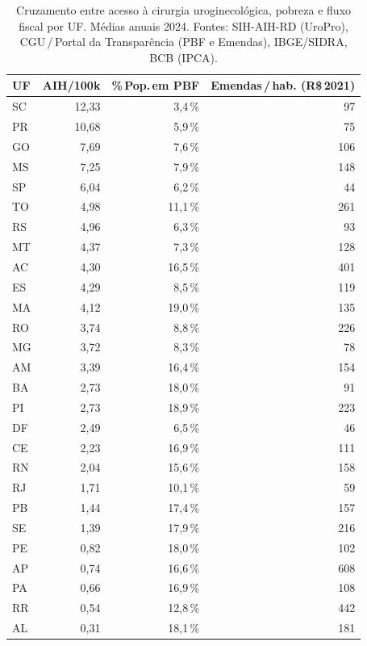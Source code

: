 \documentclass[12pt,a4paper,oneside]{article}
\begin{document}
\begin{table}[H]
\centering
\caption{Cruzamento entre acesso à cirurgia uroginecológica,
pobreza e fluxo fiscal por UF. Médias anuais 2024.
Fontes: SIH-AIH-RD (UroPro), CGU\,/\,Portal da Transparência
(PBF e Emendas), IBGE/SIDRA, BCB (IPCA).}
\label{tab:cruzamento}
\small
\begin{tabular}{lrrr}
\toprule
\textbf{UF} & \textbf{AIH/100k} & \textbf{\%\,Pop.\,em PBF} & \textbf{Emendas\,/\,hab. (R\$\,2021)} \\
\midrule
SC &  12{,}33 &  3{,}4\,\% &   97 \\
PR &  10{,}68 &  5{,}9\,\% &   75 \\
GO &   7{,}69 &  7{,}6\,\% &  106 \\
MS &   7{,}25 &  7{,}9\,\% &  148 \\
SP &   6{,}04 &  6{,}2\,\% &   44 \\
TO &   4{,}98 & 11{,}1\,\% &  261 \\
RS &   4{,}96 &  6{,}3\,\% &   93 \\
MT &   4{,}37 &  7{,}3\,\% &  128 \\
AC &   4{,}30 & 16{,}5\,\% &  401 \\
ES &   4{,}29 &  8{,}5\,\% &  119 \\
MA &   4{,}12 & 19{,}0\,\% &  135 \\
RO &   3{,}74 &  8{,}8\,\% &  226 \\
MG &   3{,}72 &  8{,}3\,\% &   78 \\
AM &   3{,}39 & 16{,}4\,\% &  154 \\
BA &   2{,}73 & 18{,}0\,\% &   91 \\
PI &   2{,}73 & 18{,}9\,\% &  223 \\
DF &   2{,}49 &  6{,}5\,\% &   46 \\
CE &   2{,}23 & 16{,}9\,\% &  111 \\
RN &   2{,}04 & 15{,}6\,\% &  158 \\
RJ &   1{,}71 & 10{,}1\,\% &   59 \\
PB &   1{,}44 & 17{,}4\,\% &  157 \\
SE &   1{,}39 & 17{,}9\,\% &  216 \\
PE &   0{,}82 & 18{,}0\,\% &  102 \\
AP &   0{,}74 & 16{,}6\,\% &  608 \\
PA &   0{,}66 & 16{,}9\,\% &  108 \\
RR &   0{,}54 & 12{,}8\,\% &  442 \\
AL &   0{,}31 & 18{,}1\,\% &  181 \\
\bottomrule
\end{tabular}
\end{table}
\end{document}
